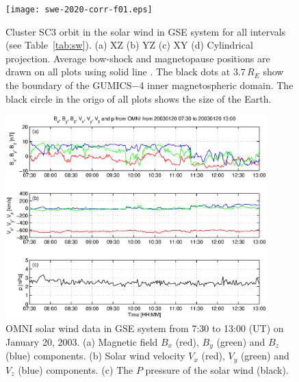 \documentclass[linenumbers,draft]{agujournal}
\begin{document}
\pagebreak

\begin{figure}[h]
\centering
\texttt{[image: swe-2020-corr-f01.eps]}  
\caption{Cluster SC3 orbit in the solar wind in GSE system for all intervals  (see Table~\ref{tab:sw}). (a) XZ (b) YZ (c) XY (d) Cylindrical projection. Average bow-shock and magnetopause positions are drawn on all plots using solid line \citep[][respectively]{peredo95:_three_alfven_mach,tsyganenko95:_model_earth}. The black dots at $3.7\,R_E$ show the boundary of the GUMICS$-$4 inner magnetospheric domain. The black circle in the origo of all plots shows the size of the Earth.}
\label{fig:sworbit}
\end{figure}

\pagebreak

\begin{figure}[h]
\centering
\includegraphics[width=0.9\textwidth,angle=0]{swe-2020-corr-f02.eps}  
\caption{OMNI solar wind data in GSE system from 7:30 to 13:00 (UT) on January 20, 2003. (a) Magnetic field $B_{x}$ (red), $B_{y}$ (green) and $B_{z}$ (blue) components. (b) Solar wind velocity $V_{x}$ (red), $V_{y}$ (green) and $V_{z}$ (blue) components. (c) The $P$ pressure of the solar wind (black).}

\label{fig:swomni}
\end{figure}

\pagebreak
\end{document}
